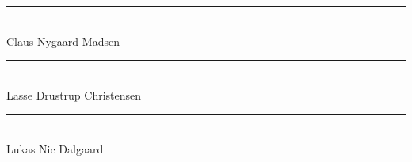 \thispagestyle{empty}
\vspace*{\fill}
\noindent
\sffamily
%
\rule{9cm}{1pt}\\
\vspace{1.5cm}
Claus Nygaard Madsen\\
%
\rule{9cm}{1pt}\\
\vspace{1.5cm}
Lasse Drustrup Christensen\\
%
\rule{9cm}{1pt}\\
\vspace{1.5cm}
Lukas Nic Dalgaard\\
%
\normalfont
\vspace*{\fill}